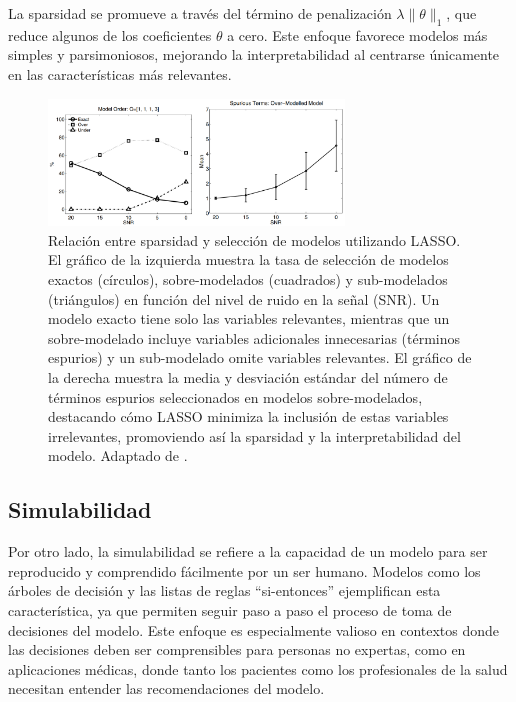La sparsidad se promueve a través del término de penalización \(\lambda \|\theta\|_1\), que reduce algunos de los coeficientes \(\theta\) a cero. Este enfoque favorece modelos más simples y parsimoniosos, mejorando la interpretabilidad al centrarse únicamente en las características más relevantes.

\begin{figure}[H]
    \centering
    \includegraphics[width=0.7\textwidth]{include/lasso.png}
    \caption{Relación entre sparsidad y selección de modelos utilizando LASSO. El gráfico de la izquierda muestra la tasa de selección de modelos exactos (círculos), sobre-modelados (cuadrados) y sub-modelados (triángulos) en función del nivel de ruido en la señal (SNR). Un modelo exacto tiene solo las variables relevantes, mientras que un sobre-modelado incluye variables adicionales innecesarias (términos espurios) y un sub-modelado omite variables relevantes. El gráfico de la derecha muestra la media y desviación estándar del número de términos espurios seleccionados en modelos sobre-modelados, destacando cómo LASSO minimiza la inclusión de estas variables irrelevantes, promoviendo así la sparsidad y la interpretabilidad del modelo. Adaptado de \cite{kukreja2006least}.}
    \label{fig:lasso}
\end{figure}

\subsection{Simulabilidad}

Por otro lado, la simulabilidad se refiere a la capacidad de un modelo para ser reproducido y comprendido fácilmente por un ser humano. Modelos como los árboles de decisión y las listas de reglas ``si-entonces'' ejemplifican esta característica, ya que permiten seguir paso a paso el proceso de toma de decisiones del modelo. Este enfoque es especialmente valioso en contextos donde las decisiones deben ser comprensibles para personas no expertas, como en aplicaciones médicas, donde tanto los pacientes como los profesionales de la salud necesitan entender las recomendaciones del modelo.

